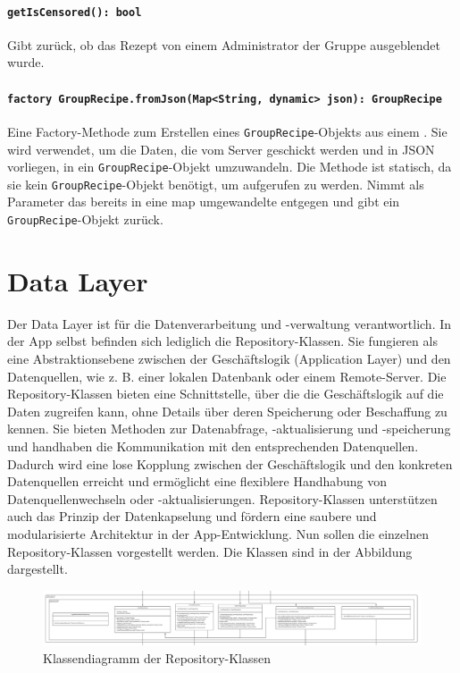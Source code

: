 \documentclass{entwurfsheft}
\begin{document}
\begin{sloppypar}
\paragraph{\texttt{getIsCensored(): bool}}
Gibt zurück, ob das Rezept von einem Administrator der Gruppe ausgeblendet wurde.
\paragraph{\texttt{factory GroupRecipe.fromJson(Map<String, dynamic> json): GroupRecipe}} Eine Factory-Methode zum Erstellen eines \texttt{GroupRecipe}-Objekts aus einem . Sie wird verwendet, um die Daten, die vom Server geschickt werden und in \Gls{JSON} vorliegen, in ein \texttt{GroupRecipe}-Objekt umzuwandeln. Die Methode ist statisch, da sie kein \texttt{GroupRecipe}-Objekt benötigt, um aufgerufen zu werden. Nimmt als Parameter das bereits in eine \Gls{map} umgewandelte  entgegen und gibt ein \texttt{GroupRecipe}-Objekt zurück.

\newpage
\section{Data Layer}\label{sec:dataLayer}
Der Data Layer ist für die Datenverarbeitung und -verwaltung verantwortlich. In der App selbst befinden sich lediglich die Repository-Klassen. Sie fungieren als eine Abstraktionsebene zwischen der Geschäftslogik (Application Layer) und den Datenquellen, wie z. B. einer lokalen Datenbank oder einem Remote-Server. Die Repository-Klassen bieten eine Schnittstelle, über die die Geschäftslogik auf die Daten zugreifen kann, ohne Details über deren Speicherung oder Beschaffung zu kennen. Sie bieten Methoden zur Datenabfrage, -aktualisierung und -speicherung und handhaben die Kommunikation mit den entsprechenden Datenquellen. Dadurch wird eine lose Kopplung zwischen der Geschäftslogik und den konkreten Datenquellen erreicht und ermöglicht eine flexiblere Handhabung von Datenquellenwechseln oder -aktualisierungen. Repository-Klassen unterstützen auch das Prinzip der Datenkapselung und fördern eine saubere und modularisierte Architektur in der App-Entwicklung.
Nun sollen die einzelnen Repository-Klassen vorgestellt werden. Die Klassen sind in der Abbildung dargestellt.
\begin{figure}[htp]
    \centering
    \includegraphics[width=\textwidth]{images/dataLayer/dataLayer.pdf}
    \caption{Klassendiagramm der Repository-Klassen}
    \label{fig:dataLayer}
\end{figure}
\newpage

\end{sloppypar}
\end{document}
